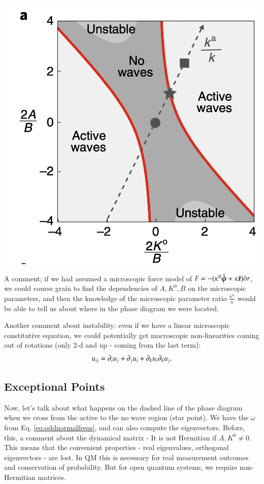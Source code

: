 \begin{center}
    \includegraphics[scale=0.5]{Lectures/Images/lec6-oddelasticphasediagram.png}
\end{center}

A comment; if we had assumed a microscopic force model of $F = -(\kappa^0\hat{\mbox{\boldmath$ \phi $}} + \kappa \hat{\mathbf{r}})\delta r$, we could course grain to find the dependencies of $A, K^0, B$ on the microscopic parameters, and then the knowledge of the microscopic parameter ratio $\frac{\kappa^0}{\kappa}$ would be able to tell us about where in the phase diagram we were located.

Another comment about instability: even if we have a linear microscopic constitutive equation, we could potentially get macroscopic non-linearities coming out of rotations (only 2-d and up - coming from the last term):
\begin{equation}
    u_{ij} = \partial_i u_j + \partial_j u_i + \partial_k u_i \partial_k u_j.
\end{equation}



\subsection{Exceptional Points}
Now, let's talk about what happens on the dashed line of the phase diagram when we cross from the active to the no wave region (star point). We have the $\omega$ from Eq. \eqref{eq:oddnormalfreqs}, and can also compute the eigenvectors. Before, this, a comment about the dynamical matrix - It is not Hermitian if $A, K^0 \neq 0$. This means that the convenient properties - real eigenvalues, orthogonal eigenvectors - are lost. In QM this is necessary for real measurement outcomes and conservation of probability. But for open quantum systems, we require non-Hermitian matrices. 

